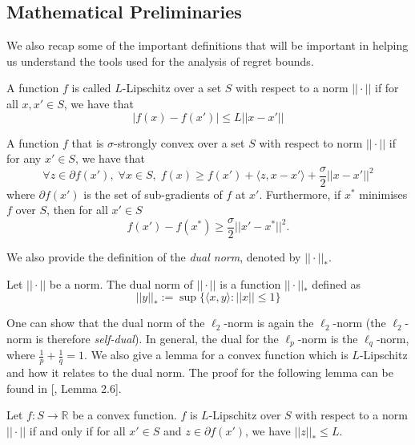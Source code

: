 \subsection{Mathematical Preliminaries}
We also recap some of the important definitions that will be important in helping us understand the tools used for the analysis of regret bounds.

\begin{define}[L-Lipschitz]
    A function $f$ is called $L$-Lipschitz over a set $S$ with respect to a norm $||\cdot||$ if for all $x, x' \in S$, we have that \begin{equation*}
        |f(x) - f(x')| \leq L ||x - x'||
    \end{equation*}
\end{define}

\begin{define}\label{defn:sigma_strong_convexity}
    A function $f$ that is $\sigma$-strongly convex over a set $S$ with respect to norm $||\cdot ||$ if for any $x' \in S$, we have that \begin{equation*}
        \forall z \in \partial f(x'),\;\forall x \in S, \; f(x) \geq f(x') + \langle z, x - x' \rangle + \frac{\sigma}{2} || x - x' ||^2
    \end{equation*}
    where $\partial f(x')$ is the set of sub-gradients of $f$ at $x'$. Furthermore, if $x^*$ minimises $f$ over $S$, then for all $x' \in S$
    \begin{equation*}
        f(x') - f(x^*) \ge \frac{\sigma}{2}||x' - x^*||^2.
    \end{equation*}
\end{define}

\noindent We also provide the definition of the \textit{dual norm}, denoted by $||\cdot||_*$.
\begin{define}
    Let $||\cdot||$ be a norm. The dual norm of $||\cdot||$ is a function $||\cdot||_*$ defined as
    \begin{equation}
        ||y||_* := \sup\{\langle x, y \rangle: ||x|| \leq 1\}
    \end{equation}
\end{define}
\noindent One can show that the dual norm of the $\ell_2$-norm is again the $\ell_2$-norm (the $\ell_2$-norm is therefore \textit{self-dual}). In general, the dual for the $\ell_p$-norm is the $\ell_q$-norm, where $\frac{1}{p} + \frac{1}{q} = 1$. We also give a lemma for a convex function which is $L$-Lipschitz and how it relates to the dual norm. The proof for the following lemma can be found in [\cite{shalev2025online}, Lemma 2.6].
\begin{lemma} Let $f: S \to \mathbb R$ be a convex function. $f$ is $L$-Lipschitz over $S$ with respect to a norm $||\cdot||$ if and only if for all $x'\in S$ and $z \in \partial f(x')$, we have $||z||_* \leq L$. 
\end{lemma}
